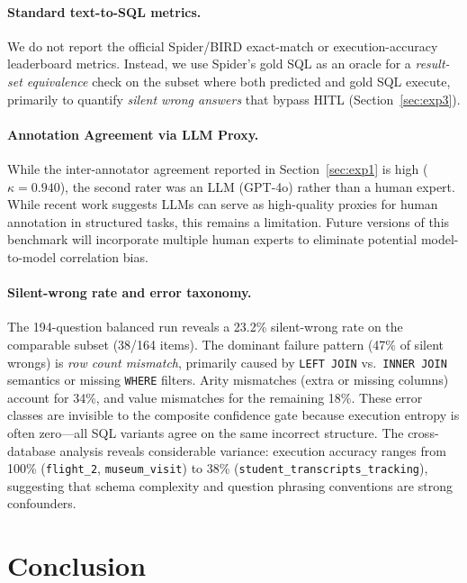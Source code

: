 \documentclass{article}
\begin{document}
\paragraph{Standard text-to-SQL metrics.}
We do not report the official Spider/BIRD exact-match or execution-accuracy
leaderboard metrics.
Instead, we use Spider's gold SQL as an oracle for a \emph{result-set
equivalence} check on the subset where both predicted and gold SQL execute,
primarily to quantify \emph{silent wrong answers} that bypass HITL
(Section~\ref{sec:exp3}).

\paragraph{Annotation Agreement via LLM Proxy.}
While the inter-annotator agreement reported in Section~\ref{sec:exp1} is high ($\kappa=0.940$), the second rater was an LLM (GPT-4o) rather than a human expert. While recent work suggests LLMs can serve as high-quality proxies for human annotation in structured tasks, this remains a limitation. Future versions of this benchmark will incorporate multiple human experts to eliminate potential model-to-model correlation bias.

\paragraph{Silent-wrong rate and error taxonomy.}
The 194-question balanced run reveals a 23.2\% silent-wrong rate on the
comparable subset (38/164 items).
The dominant failure pattern (47\% of silent wrongs) is \emph{row count mismatch},
primarily caused by \texttt{LEFT JOIN} vs.\ \texttt{INNER JOIN} semantics or
missing \texttt{WHERE} filters. Arity mismatches (extra or missing columns)
account for 34\%, and value mismatches for the remaining 18\%.
These error classes are invisible to the composite confidence gate because
execution entropy is often zero---all SQL variants agree on the same incorrect
structure. The cross-database analysis reveals considerable variance:
execution accuracy ranges from 100\% (\texttt{flight\_2}, \texttt{museum\_visit})
to 38\% (\texttt{student\_transcripts\_tracking}), suggesting that
schema complexity and question phrasing conventions are strong confounders.

\section{Conclusion}
\label{sec:conclusion}
\end{document}
